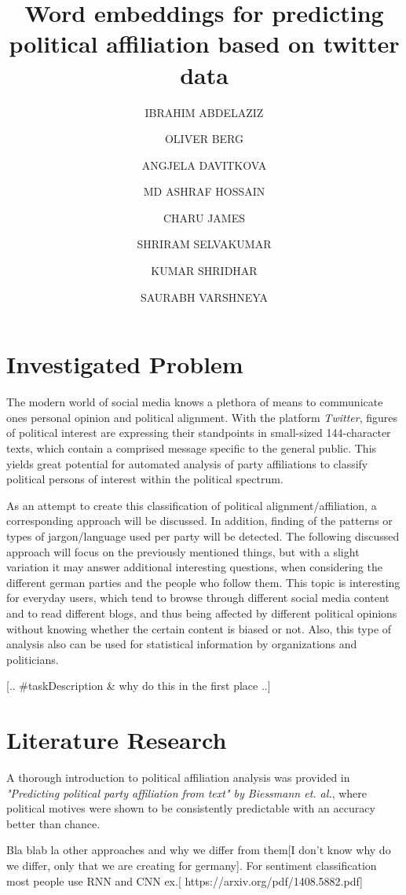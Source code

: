 \documentclass[10pt, oneside]{article}
\title{Word embeddings for predicting political affiliation based on twitter data}
\author[]{IBRAHIM ABDELAZIZ}
\author[]{OLIVER BERG}
\author[]{ANGJELA DAVITKOVA}
\author[]{MD ASHRAF HOSSAIN}
\author[]{CHARU JAMES}
\author[]{SHRIRAM SELVAKUMAR}
\author[]{KUMAR SHRIDHAR}
\author[]{SAURABH VARSHNEYA}
\affil[1]{Technische Universität Kaiserslautern}
\begin{document}
\maketitle



\section{Investigated Problem}

The modern world of social media knows a plethora of means to communicate ones personal opinion and political alignment. With the platform \textit{Twitter}, figures of political interest are expressing their standpoints in small-sized 144-character texts, which contain a comprised message specific to the general public. This yields great potential for automated analysis of party affiliations to classify political persons of interest within the political spectrum.

As an attempt to create this classification of political alignment/affiliation, a corresponding approach will be discussed. In addition, finding of the patterns or types of jargon/language used per party will be detected. The following discussed approach will focus on the previously mentioned things, but with a slight variation it may answer additional interesting questions, when considering the different german parties and the people who follow them.
This topic is interesting for everyday users, which tend to browse through different social media content and to read different blogs, and thus being affected by different political opinions without knowing whether the certain content is biased or not. Also, this type of analysis also can be used for statistical information by organizations and politicians. 


[.. \#taskDescription \& why do this in the first place ..]



\section{Literature Research}

A thorough introduction to political affiliation analysis was provided in \textit{"Predicting political party affiliation from text" by Biessmann et. al.}, where political motives were shown to be consistently predictable with an accuracy better than chance. 

Bla blab la other approaches and why we differ from them[I don’t know why do we differ, only that we are creating for germany].
For sentiment classification most people use RNN and CNN ex.[ https://arxiv.org/pdf/1408.5882.pdf]
\end{document}

